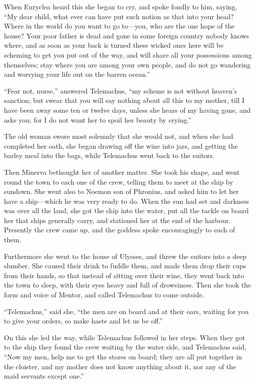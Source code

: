 When Euryclea heard this she began to cry, and spoke fondly to him, saying, “My
dear child, what ever can have put such notion as that into your head? Where in
the world do you want to go to—you, who are the one hope of the house? Your
poor father is dead and gone in some foreign country nobody knows where, and as
soon as your back is turned these wicked ones here will be scheming to get you
put out of the way, and will share all your possessions among themselves; stay
where you are among your own people, and do not go wandering and worrying your
life out on the barren ocean.”

“Fear not, nurse,” answered Telemachus, “my scheme is not without heaven’s
sanction; but swear that you will say nothing about all this to my mother, till
I have been away some ten or twelve days, unless she hears of my having gone,
and asks you; for I do not want her to spoil her beauty by crying.”

The old woman swore most solemnly that she would not, and when she had
completed her oath, she began drawing off the wine into jars, and getting the
barley meal into the bags, while Telemachus went back to the suitors.

Then Minerva bethought her of another matter. She took his shape, and went
round the town to each one of the crew, telling them to meet at the ship by
sundown. She went also to Noemon son of Phronius, and asked him to let her have
a ship—which he was very ready to do. When the sun had set and darkness was
over all the land, she got the ship into the water, put all the tackle on board
her that ships generally carry, and stationed her at the end of the harbour.
Presently the crew came up, and the goddess spoke encouragingly to each of
them.

Furthermore she went to the house of Ulysses, and threw the suitors into a deep
slumber. She caused their drink to fuddle them, and made them drop their cups
from their hands, so that instead of sitting over their wine, they went back
into the town to sleep, with their eyes heavy and full of drowsiness. Then she
took the form and voice of Mentor, and called Telemachus to come outside.

“Telemachus,” said she, “the men are on board and at their oars, waiting for
you to give your orders, so make haste and let us be off.”

On this she led the way, while Telemachus followed in her steps. When they got
to the ship they found the crew waiting by the water side, and Telemachus said,
“Now my men, help me to get the stores on board; they are all put together in
the cloister, and my mother does not know anything about it, nor any of the
maid servants except one.”


